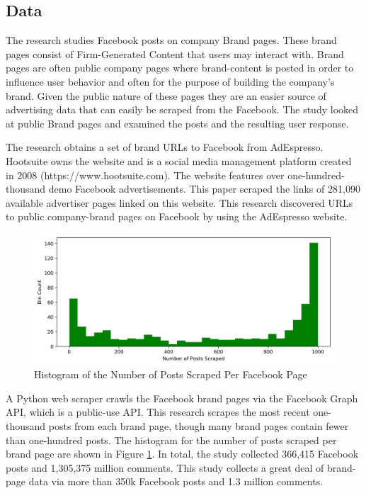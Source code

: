 \documentclass{article}
\begin{document}
\subsection{Data}
The research studies Facebook posts on company Brand pages. These brand pages consist of Firm-Generated Content that users may interact with. Brand pages are often public company pages where brand-content is posted in order to influence user behavior and often for the purpose of building the company's brand. Given the public nature of these pages they are an easier source of advertising data that can easily be scraped from the Facebook. The study looked at public Brand pages and examined the posts and the resulting user response.

The research obtains a set of brand URLs to Facebook from AdEspresso. Hootsuite owns the website and is a social media management platform created in 2008 (https://www.hootsuite.com). The website features over one-hundred-thousand demo Facebook advertisements. This paper scraped the links of 281,090 available advertiser pages linked on this website. This research discovered URLs to public company-brand pages on Facebook by using the AdEspresso website.

\begin{figure}
    \includegraphics[width=\columnwidth]{images/Posts_Per_Page_Histogram.png}
    \caption{Histogram of the Number of Posts Scraped Per Facebook Page}
    \label{fig:histogram_posts_scraped}
\end{figure}


A Python web scraper crawls the Facebook brand pages via the Facebook Graph API, which is a public-use API. This research scrapes the most recent one-thousand posts from each brand page, though many brand pages contain fewer than one-hundred posts. The histogram for the number of posts scraped per brand page are shown in Figure \ref{fig:histogram_posts_scraped}. In total, the study collected 366,415 Facebook posts and 1,305,375 million comments. This study collects a great deal of brand-page data via more than 350k Facebook posts and 1.3 million comments.
\end{document}
